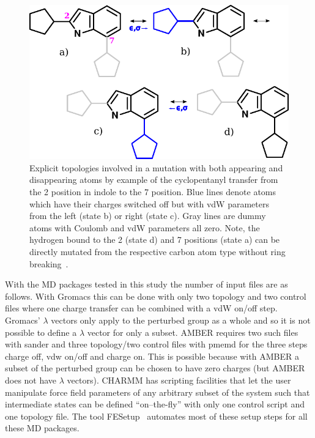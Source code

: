 \documentclass[journal=jctcce,manuscript=suppinfo]{achemso}
\begin{document}
\begin{figure}[ht]
\includegraphics[scale=1.0]{figures/dummies2.pdf}
\caption{Explicit topologies involved in a mutation with both
  appearing and disappearing atoms by example of the cyclopentanyl
  transfer from the 2 position in indole to the 7 position.  Blue
  lines denote atoms which have their charges switched off but with
  vdW parameters from the left (state b) or right (state c). Gray
  lines are dummy atoms with Coulomb and vdW parameters all zero.
  Note, the hydrogen bound to the 2 (state d) and 7 positions (state
  a) can be directly mutated from the respective carbon atom type
  without ring breaking~\cite{doi:10.1021/acs.jcim.5b00057}.}
\label{fig:dummies2}
\end{figure}

With the MD packages tested in this study the number of input files
are as follows.  With Gromacs this can be done with only two topology
and two control files where one charge transfer can be combined with a
vdW on/off step.  Gromacs' $\lambda$ vectors only apply to the
perturbed group as a whole and so it is not possible to define a
$\lambda$ vector for only a subset.  AMBER requires two such files
with sander and three topology/two control files with pmemd for the
three steps charge off, vdw on/off and charge on.  This is possible because
with AMBER a subset of the perturbed group can be chosen to have zero
charges (but AMBER does not have $\lambda$ vectors).  CHARMM has
scripting facilities that let the user manipulate force field
parameters of any arbitrary subset of the system such that
intermediate states can be defined ``on--the-fly'' with only one
control script and one topology file.  The tool
FESetup~\cite{loeffler_fesetup:_2015} automates most of these setup
steps for all these MD packages.
\end{document}
